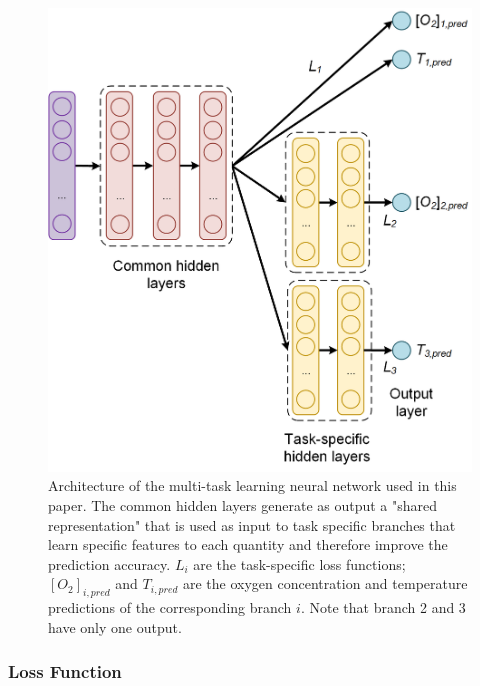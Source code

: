 \documentclass[9pt,twocolumn,twoside,pdftex]{optica}
\begin{document}
\begin{figure}[t!]
\centering
\includegraphics[width=8.7 cm]{NN_MTL.png}
\caption{Architecture of the multi-task learning neural network used in this paper. The common hidden layers generate as output a "shared representation" that is used as input to task specific branches that learn specific features to each quantity and therefore improve the prediction accuracy. $L_i$ are the task-specific loss functions; $[O_2]_{i,pred}$ and $T_{i,pred}$ are the oxygen concentration and temperature predictions of  the corresponding branch $i$. Note that branch 2 and 3 have only one output.} 
\label{fig:NN_MTL_O2_T}
\end{figure}


\subsubsection{Loss Function}
\end{document}
